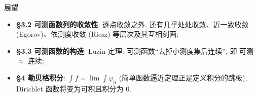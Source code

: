 
\begin{frame}{展望}

\begin{itemize}
\item \textbf{\S 3.2 可测函数列的收敛性}: 逐点收敛之外, 还有\alert{几乎处处收敛、近一致收敛 (Egorov)、依测度收敛 (Riesz)} 等层次及其互相刻画;
\pause
\item \textbf{\S 3.3 可测函数的构造}: Luzin 定理: 可测函数``去掉小测度集后连续'', 即 \alert{可测 $\approx$ 连续};
\pause
\item \textbf{\S 4 勒贝格积分}: $\displaystyle\int f = \lim \int \varphi_n$ (简单函数逼近定理正是定义积分的跳板), Dirichlet 函数将变为可积且积分为 $0$.
\end{itemize}

\end{frame}





